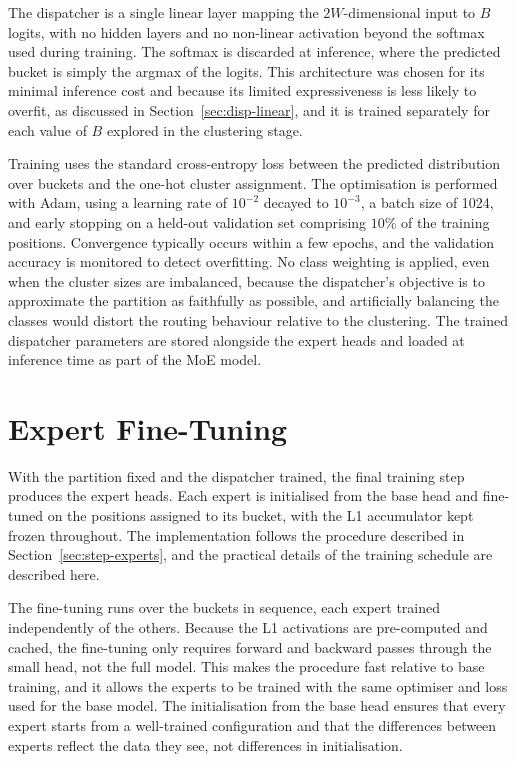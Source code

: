 The dispatcher is a single linear layer mapping the \(2W\)-dimensional input to \(B\) logits, with no hidden layers and no non-linear activation beyond the softmax used during training. The softmax is discarded at inference, where the predicted bucket is simply the argmax of the logits. This architecture was chosen for its minimal inference cost and because its limited expressiveness is less likely to overfit, as discussed in Section~\ref{sec:disp-linear}, and it is trained separately for each value of \(B\) explored in the clustering stage.

Training uses the standard cross-entropy loss between the predicted distribution over buckets and the one-hot cluster assignment. The optimisation is performed with Adam, using a learning rate of \(10^{-2}\) decayed to \(10^{-3}\), a batch size of 1024, and early stopping on a held-out validation set comprising \(10\%\) of the training positions. Convergence typically occurs within a few epochs, and the validation accuracy is monitored to detect overfitting. No class weighting is applied, even when the cluster sizes are imbalanced, because the dispatcher's objective is to approximate the partition as faithfully as possible, and artificially balancing the classes would distort the routing behaviour relative to the clustering. The trained dispatcher parameters are stored alongside the expert heads and loaded at inference time as part of the MoE model.

\section{Expert Fine-Tuning}\label{sec:expert-impl}

With the partition fixed and the dispatcher trained, the final training step produces the expert heads. Each expert is initialised from the base head and fine-tuned on the positions assigned to its bucket, with the L1 accumulator kept frozen throughout. The implementation follows the procedure described in Section~\ref{sec:step-experts}, and the practical details of the training schedule are described here.

The fine-tuning runs over the buckets in sequence, each expert trained independently of the others. Because the L1 activations are pre-computed and cached, the fine-tuning only requires forward and backward passes through the small head, not the full model. This makes the procedure fast relative to base training, and it allows the experts to be trained with the same optimiser and loss used for the base model. The initialisation from the base head ensures that every expert starts from a well-trained configuration and that the differences between experts reflect the data they see, not differences in initialisation.

